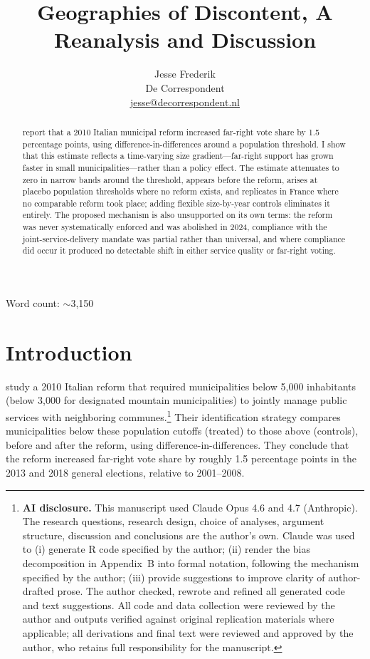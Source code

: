 \documentclass[12pt,letterpaper]{article}
\title{Geographies of Discontent, A Reanalysis and Discussion}
\author{}
\author{Jesse Frederik\\
  \small De Correspondent\\
  \small \href{mailto:jesse@decorrespondent.nl}{jesse@decorrespondent.nl}}
\date{}
\begin{document}
\maketitle
\thispagestyle{empty}

\begin{center}
\small Word count: $\sim$3,150
\end{center}

\begin{abstract}
\noindent \citet{cremaschi2024} report that a 2010 Italian municipal reform increased far-right vote share by 1.5 percentage points, using difference-in-differences around a population threshold. I show that this estimate reflects a time-varying size gradient---far-right support has grown faster in small municipalities---rather than a policy effect. The estimate attenuates to zero in narrow bands around the threshold, appears before the reform, arises at placebo population thresholds where no reform exists, and replicates in France where no comparable reform took place; adding flexible size-by-year controls eliminates it entirely. The proposed mechanism is also unsupported on its own terms: the reform was never systematically enforced and was abolished in 2024, compliance with the joint-service-delivery mandate was partial rather than universal, and where compliance did occur it produced no detectable shift in either service quality or far-right voting.
\end{abstract}

\newpage

\section{Introduction}

\citet{cremaschi2024} study a 2010 Italian reform that required municipalities below 5,000 inhabitants (below 3,000 for designated mountain municipalities) to jointly manage public services with neighboring communes.\footnote{\textbf{AI disclosure.} This manuscript used Claude Opus 4.6 and 4.7 (Anthropic). The research questions, research design, choice of analyses, argument structure, discussion and conclusions are the author's own. Claude was used to (i) generate R code specified by the author; (ii) render the bias decomposition in Appendix~B into formal notation, following the mechanism specified by the author; (iii) provide suggestions to improve clarity of author-drafted prose. The author checked, rewrote and refined all generated code and text suggestions. All code and data collection were reviewed by the author and outputs verified against original replication materials where applicable; all derivations and final text were reviewed and approved by the author, who retains full responsibility for the manuscript.} Their identification strategy compares municipalities below these population cutoffs (treated) to those above (controls), before and after the reform, using difference-in-differences. They conclude that the reform increased far-right vote share by roughly 1.5 percentage points in the 2013 and 2018 general elections, relative to 2001--2008.
\end{document}
